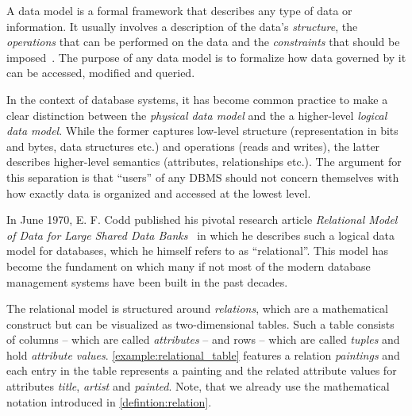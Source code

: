 A data model is a formal framework that describes any type of data or information. It usually involves a description of the data's \emph{structure}, the \emph{operations} that can be performed on the data and the \emph{constraints} that should be imposed~\cite{Garcia:2009Database}. The purpose of any data model is to formalize how data governed by it can be accessed, modified and queried.

In the context of database systems, it has become common practice to make a clear distinction between the \emph{physical data model} and the a higher-level \emph{logical data model}. While the former captures low-level structure (representation in bits and bytes, data structures etc.) and operations (reads and writes), the latter describes higher-level semantics (attributes, relationships etc.). The argument for this separation is that ``users'' of any DBMS should not concern themselves with how exactly data is organized and accessed at the lowest level.

In June 1970, E. F. Codd published his pivotal research article \emph{Relational Model of Data for Large Shared Data Banks}~\cite{Codd:1970Relational} in which he describes such a logical data model for databases, which he himself refers to as ``relational''. This model has become the fundament on which many if not most of the modern database management systems have been built in the past decades. 

The relational model is structured around \emph{relations}, which are a mathematical construct but can be visualized as two-dimensional tables. Such a table consists of columns -- which are called \emph{attributes} -- and rows -- which are called \emph{tuples} and hold \emph{attribute values}. \cref{example:relational_table} features a relation \emph{paintings} and each entry in the table represents a painting and the related attribute values for attributes \emph{title}, \emph{artist} and \emph{painted}. Note, that we already use the mathematical notation introduced in \cref{defintion:relation}.

